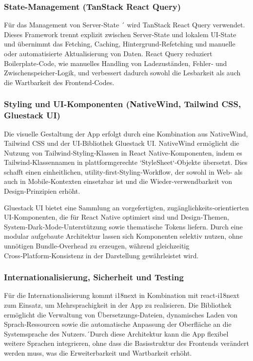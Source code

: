 \subsubsection{State-Management (TanStack React Query)}

Für das Management von Server‑State ´ wird TanStack React Query verwendet. Dieses Framework trennt explizit zwischen Server‑State und lokalem UI‑State und übernimmt das Fetching, Caching, Hintergrund‑Refetching und manuelle oder automatisierte Aktualisierung von Daten.
React Query reduziert Boilerplate‑Code, wie manuelles Handling von Ladezuständen, Fehler‑ und Zwischenspeicher‑Logik, und verbessert dadurch sowohl die Lesbarkeit als auch die Wartbarkeit des Frontend‑Codes.

\subsubsection{Styling und UI-Komponenten (NativeWind, Tailwind CSS, Gluestack UI)}

Die visuelle Gestaltung der App erfolgt durch eine Kombination aus NativeWind, Tailwind CSS und der UI‑Bibliothek Gluestack UI. NativeWind ermöglicht die Nutzung von Tailwind‑Styling‑Klassen in React Native‑Komponenten, indem es Tailwind‑Klassennamen in plattformgerechte `StyleSheet`‑Objekte übersetzt. Dies schafft einen einheitlichen, utility‑first‑Styling‑Workflow, der sowohl in Web‑ als auch in Mobile‑Kontexten einsetzbar ist und die Wieder‑verwendbarkeit von Design‑Prinzipien erhöht.

Gluestack UI bietet eine Sammlung an vorgefertigten, zugänglichkeits‑orientierten UI‑Komponenten, die für React Native optimiert sind und Design‑Themen, System‑Dark‑Mode‑Unterstützung sowie thematische Tokens liefern. Durch eine modular aufgebaute Architektur lassen sich Komponenten selektiv nutzen, ohne unnötigen Bundle‑Overhead zu erzeugen, während gleichzeitig Cross‑Platform‑Konsistenz in der Darstellung gewährleistet wird. 

\subsubsection{Internationalisierung, Sicherheit und Testing}

Für die Internationalisierung kommt i18next in Kombination mit react‑i18next zum Einsatz, um Mehrsprachigkeit in der App zu realisieren. Die Bibliothek ermöglicht die Verwaltung von Übersetzungs‑Dateien, dynamisches Laden von Sprach‑Ressourcen sowie die automatische Anpassung der Oberfläche an die Systemsprache des Nutzers.´Durch diese Architektur kann die App flexibel weitere Sprachen integrieren, ohne dass die Basisstruktur des Frontends verändert werden muss, was die Erweiterbarkeit und Wartbarkeit erhöht. 

